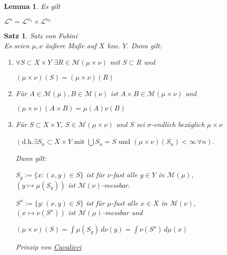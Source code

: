 \documentclass[11pt]{memoir}
\theoremstyle{changebreak}
\newtheorem{Lemma}{Lemma}[chapter]
\newtheorem{Satz}{Satz}[chapter]
\begin{document}
\begin{Lemma}
Es gilt
\begin{center}
	$\mathscr L^n = \mathscr L^{n_1} \times \mathscr L^{n_2}$
\end{center}
\end{Lemma}


\begin{Satz}
\emph{Satz von Fubini} \\
Es seien $\mu, \nu$ äußere Maße auf $X$ bzw. $Y$. Dann gilt:
\begin{enumerate}
	\item $\forall S \subset X \times Y$ $\exists R \in \mathscr M(\mu \times \nu)$ mit $S \subset R$ und
	\begin{center}
		$(\mu \times \nu)(S) = (\mu \times \nu)(R)$
	\end{center}
	\item Für $A \in \mathscr M(\mu), B \in \mathscr M(\nu)$ ist $A \times B \in \mathscr M(\mu \times \nu)$ und
	\begin{center}
		$(\mu \times \nu)(A \times B) = \mu(A)\nu(B)$
	\end{center}
	\item Für $S \subset X \times Y$, $S \in \mathscr M(\mu \times \nu)$ und $S$ sei $\sigma$-endlich bezüglich $\mu \times \nu$
	\par
	$\left(\text{d.h.} \exists S_n \subset X \times Y \text{ mit }\bigcup S_n = S\text{ und }(\mu \times \nu)(S_n) < \infty \,\forall n\right)$.
	\par
	Dann gilt:
	\par
	$S_y := \{x: (x, y) \in S\}$ ist für $\nu$-fast alle $y \in Y$ in $\mathscr M(\mu)$, \\
	$(y \mapsto \mu(S_y))$ ist $\mathscr M(\nu)$-messbar. \\
	\par
	$S^x := \{y : (x, y) \in S\}$ ist für $\mu$-fast alle $x \in X$ in $\mathscr M(\nu)$, \\
	$(x \mapsto \nu(S^x))$ ist $\mathscr M(\mu)$-messbar und
	\begin{center}
		$(\mu \times \nu)(S) = \int \mu(S_y)\, d\nu(y) = \int \nu(S^x) \, d\mu(x)$ \\
	\end{center}
	\emph{Prinzip von \underline{Cavalieri}}


\end{enumerate}
\end{Satz}
\end{document}
